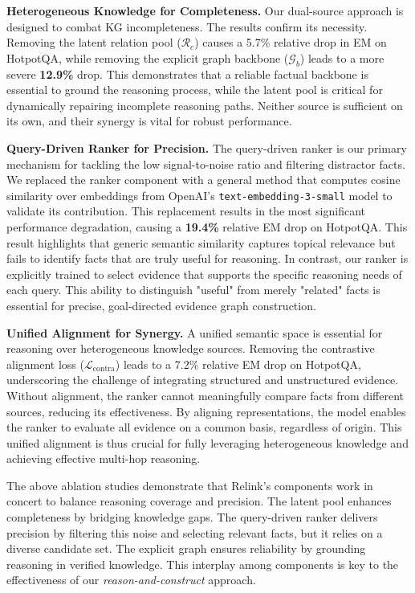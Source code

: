 \documentclass[letterpaper]{article} %
\begin{document}
\noindent\textbf{Heterogeneous Knowledge for Completeness.} Our dual-source approach is designed to combat KG incompleteness. The results confirm its necessity. Removing the latent relation pool ($\mathcal{R}_c$) causes a 5.7\% relative drop in EM on HotpotQA, while removing the explicit graph backbone ($\mathcal{G}_b$) leads to a more severe \textbf{12.9\%} drop. This demonstrates that a reliable factual backbone is essential to ground the reasoning process, while the latent pool is critical for dynamically repairing incomplete reasoning paths. Neither source is sufficient on its own, and their synergy is vital for robust performance.

\noindent\textbf{Query-Driven Ranker for Precision.} The query-driven ranker is our primary mechanism for tackling the low signal-to-noise ratio and filtering distractor facts. We replaced the ranker component with a general method that computes cosine similarity over embeddings from OpenAI’s \texttt{text-embedding-3-small} model to validate its contribution. This replacement results in the most significant performance degradation, causing a \textbf{19.4\%} relative EM drop on HotpotQA. This result highlights that generic semantic similarity captures topical relevance but fails to identify facts that are truly useful for reasoning. In contrast, our ranker is explicitly trained to select evidence that supports the specific reasoning needs of each query. This ability to distinguish "useful" from merely "related" facts is essential for precise, goal-directed evidence graph construction.

\noindent\textbf{Unified Alignment for Synergy.} A unified semantic space is essential for reasoning over heterogeneous knowledge sources. Removing the contrastive alignment loss ($\mathcal{L}_{\text{contra}}$) leads to a 7.2\% relative EM drop on HotpotQA, underscoring the challenge of integrating structured and unstructured evidence. Without alignment, the ranker cannot meaningfully compare facts from different sources, reducing its effectiveness. By aligning representations, the model enables the ranker to evaluate all evidence on a common basis, regardless of origin. This unified alignment is thus crucial for fully leveraging heterogeneous knowledge and achieving effective multi-hop reasoning.

The above ablation studies demonstrate that Relink’s components work in concert to balance reasoning coverage and precision. The latent pool enhances completeness by bridging knowledge gaps. The query-driven ranker delivers precision by filtering this noise and selecting relevant facts, but it relies on a diverse candidate set. The explicit graph ensures reliability by grounding reasoning in verified knowledge. This interplay among components is key to the effectiveness of our \textit{reason-and-construct} approach.
\end{document}
